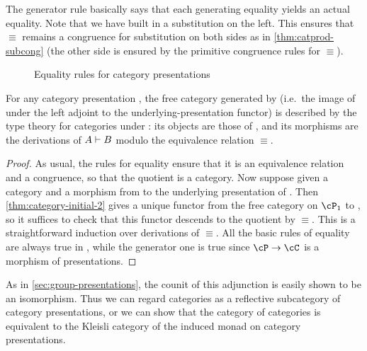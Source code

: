 The generator rule basically says that each generating equality yields an actual equality.
Note that we have built in a substitution on the left.
This ensures that $\equiv$ remains a congruence for substitution on both sides as in \cref{thm:catprod-subcong} (the other side is ensured by the primitive congruence rules for $\equiv$).


\begin{figure}
  \centering
  \caption{Equality rules for category presentations}
  \label{fig:catpres-equality}
\end{figure}

\begin{thm}\label{thm:catpres-initial}
  For any category presentation \cP, the free category generated by \cP (i.e.\ the image of \cP under the left adjoint to the underlying-presentation functor) is described by the type theory for categories under \cP: its objects are those of \cP, and its morphisms are the derivations of $A\vdash B$ modulo the equivalence relation $\equiv$.
\end{thm}
\begin{proof}
  As usual, the rules for equality ensure that it is an equivalence relation and a congruence, so that the quotient is a category.
  Now suppose given a category \cC and a morphism from \cP to the underlying presentation of \cC.
  Then \cref{thm:category-initial-2} gives a unique functor from the free category on $\cP_1$ to \cC, so it suffices to check that this functor descends to the quotient by $\equiv$.
  This is a straightforward induction over derivations of $\equiv$.
  All the basic rules of equality are always true in \cC, while the generator one is true since $\cP\to\cC$ is a morphism of presentations.
\end{proof}

As in \cref{sec:group-presentations}, the counit of this adjunction is easily shown to be an isomorphism.
Thus we can regard categories as a reflective subcategory of category presentations, or we can show that the category of categories is equivalent to the Kleisli category of the induced monad on category presentations.


